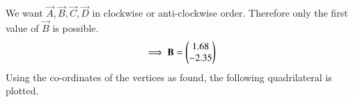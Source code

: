 \documentclass[journal,12pt,twocolumn]{IEEEtran}
\begin{document}
We want $\vec{A},\vec{B},\vec{C},\vec{D}$ in clockwise or anti-clockwise order. Therefore only the first value of $\vec{B}$ is possible. 
\begin{equation}
    \implies \mathbf{B} = \begin{pmatrix}1.68\\-2.35\end{pmatrix}
\end{equation}
Using the co-ordinates of the vertices as found, the following quadrilateral is plotted.
\begin{figure}[h]
\end{figure}
\end{document}
